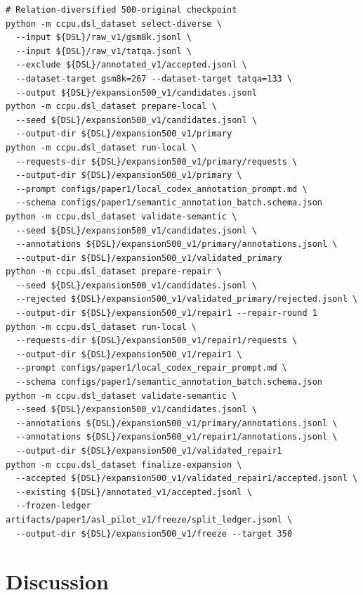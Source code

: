 \documentclass[11pt]{article}
\begin{document}
\begin{verbatim}
# Relation-diversified 500-original checkpoint
python -m ccpu.dsl_dataset select-diverse \
  --input ${DSL}/raw_v1/gsm8k.jsonl \
  --input ${DSL}/raw_v1/tatqa.jsonl \
  --exclude ${DSL}/annotated_v1/accepted.jsonl \
  --dataset-target gsm8k=267 --dataset-target tatqa=133 \
  --output ${DSL}/expansion500_v1/candidates.jsonl
python -m ccpu.dsl_dataset prepare-local \
  --seed ${DSL}/expansion500_v1/candidates.jsonl \
  --output-dir ${DSL}/expansion500_v1/primary
python -m ccpu.dsl_dataset run-local \
  --requests-dir ${DSL}/expansion500_v1/primary/requests \
  --output-dir ${DSL}/expansion500_v1/primary \
  --prompt configs/paper1/local_codex_annotation_prompt.md \
  --schema configs/paper1/semantic_annotation_batch.schema.json
python -m ccpu.dsl_dataset validate-semantic \
  --seed ${DSL}/expansion500_v1/candidates.jsonl \
  --annotations ${DSL}/expansion500_v1/primary/annotations.jsonl \
  --output-dir ${DSL}/expansion500_v1/validated_primary
python -m ccpu.dsl_dataset prepare-repair \
  --seed ${DSL}/expansion500_v1/candidates.jsonl \
  --rejected ${DSL}/expansion500_v1/validated_primary/rejected.jsonl \
  --output-dir ${DSL}/expansion500_v1/repair1 --repair-round 1
python -m ccpu.dsl_dataset run-local \
  --requests-dir ${DSL}/expansion500_v1/repair1/requests \
  --output-dir ${DSL}/expansion500_v1/repair1 \
  --prompt configs/paper1/local_codex_repair_prompt.md \
  --schema configs/paper1/semantic_annotation_batch.schema.json
python -m ccpu.dsl_dataset validate-semantic \
  --seed ${DSL}/expansion500_v1/candidates.jsonl \
  --annotations ${DSL}/expansion500_v1/primary/annotations.jsonl \
  --annotations ${DSL}/expansion500_v1/repair1/annotations.jsonl \
  --output-dir ${DSL}/expansion500_v1/validated_repair1
python -m ccpu.dsl_dataset finalize-expansion \
  --accepted ${DSL}/expansion500_v1/validated_repair1/accepted.jsonl \
  --existing ${DSL}/annotated_v1/accepted.jsonl \
  --frozen-ledger artifacts/paper1/asl_pilot_v1/freeze/split_ledger.jsonl \
  --output-dir ${DSL}/expansion500_v1/freeze --target 350
\end{verbatim}

\section{Discussion}
\label{sec:discussion}
\end{document}
